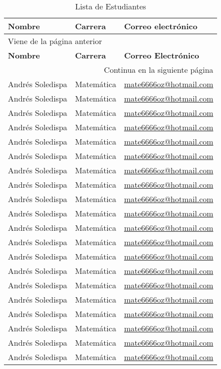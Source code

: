 \documentclass[a4paper,12pt]{article}
\begin{document}
\begin{longtable}{lll}
\caption{Lista de Estudiantes} \\
\toprule
\textbf{Nombre} & \textbf{Carrera} & \textbf{Correo electrónico} \\
\midrule
\endfirsthead
%
\multicolumn{3}{l}{\footnotesize Viene de la página anterior} \\
\toprule
\textbf{Nombre} & \textbf{Carrera} & \textbf{Correo Electrónico} \\ \midrule
\endhead
\bottomrule \multicolumn{3}{r}{\footnotesize Continua en la siguiente página}
\endfoot
\bottomrule
\endlastfoot
%
Andrés Soledispa & Matemática & \url{asoledispatiban@gmail.com}\\
Andrés Soledispa & Matemática & \url{mate6666oz@hotmail.com}\\
Andrés Soledispa & Matemática & \url{mate6666oz@hotmail.com}
\\
Andrés Soledispa & Matemática & \url{mate6666oz@hotmail.com}
\\
Andrés Soledispa & Matemática & \url{mate6666oz@hotmail.com}
\\
Andrés Soledispa & Matemática & \url{mate6666oz@hotmail.com}
\\
Andrés Soledispa & Matemática & \url{mate6666oz@hotmail.com}
\\
Andrés Soledispa & Matemática & \url{mate6666oz@hotmail.com}
\\
Andrés Soledispa & Matemática & \url{mate6666oz@hotmail.com}
\\
Andrés Soledispa & Matemática & \url{mate6666oz@hotmail.com}
\\
Andrés Soledispa & Matemática & \url{mate6666oz@hotmail.com}
\\
Andrés Soledispa & Matemática & \url{mate6666oz@hotmail.com}
\\
Andrés Soledispa & Matemática & \url{mate6666oz@hotmail.com}
\\
Andrés Soledispa & Matemática & \url{mate6666oz@hotmail.com}
\\
Andrés Soledispa & Matemática & \url{mate6666oz@hotmail.com}
\\
Andrés Soledispa & Matemática & \url{mate6666oz@hotmail.com}
\\
Andrés Soledispa & Matemática & \url{mate6666oz@hotmail.com}
\\
Andrés Soledispa & Matemática & \url{mate6666oz@hotmail.com}
\\
Andrés Soledispa & Matemática & \url{mate6666oz@hotmail.com}
\\
Andrés Soledispa & Matemática & \url{mate6666oz@hotmail.com}
\\
Andrés Soledispa & Matemática & \url{mate6666oz@hotmail.com}
\\
\end{longtable}
\end{document}
